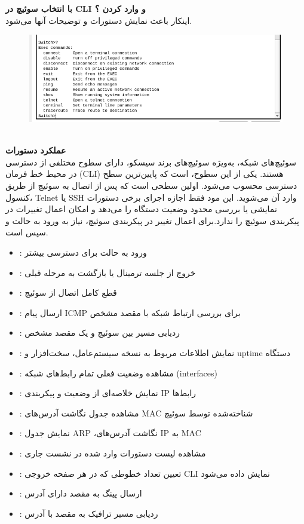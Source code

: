 
\textbf{با انتخاب سوئیچ در CLI و وارد کردن ؟}
\\
اینکار باعث نمایش دستورات و توضیحات آنها می‌شود.
\begin{figure}[h]
    \centering
    \includegraphics[width=1\textwidth]{img/q/1.png}
\end{figure}

\\
\textbf{عملکرد دستورات}
\\
سوئیچ‌های شبکه، به‌ویژه سوئیچ‌های برند سیسکو، دارای سطوح مختلفی از دسترسی در محیط خط فرمان (CLI) هستند. یکی از این سطوح،  است که پایین‌ترین سطح دسترسی محسوب می‌شود.
 اولین سطحی است که پس از اتصال به سوئیچ از طریق کنسول، Telnet یا SSH وارد آن می‌شوید. این مود فقط اجازه اجرای برخی دستورات نمایشی یا بررسی محدود وضعیت دستگاه را می‌دهد و امکان اعمال تغییرات در پیکربندی سوئیچ را ندارد.برای اعمال تغییر در پیکربندی سوئیچ، نیاز به ورود به حالت  و سپس  است.

\begin{itemize}
    \item {}: ورود به حالت  برای دسترسی بیشتر
    \item {}: خروج از جلسه ترمینال یا بازگشت به مرحله قبلی
    \item {}: قطع کامل اتصال از سوئیچ
    \item {}: ارسال پیام ICMP برای بررسی ارتباط شبکه با مقصد مشخص
    \item {}: ردیابی مسیر بین سوئیچ و یک مقصد مشخص
    \item {}: نمایش اطلاعات مربوط به نسخه سیستم‌عامل، سخت‌افزار و uptime دستگاه
    \item {}: مشاهده وضعیت فعلی تمام رابط‌های شبکه (interfaces)
    \item {}: نمایش خلاصه‌ای از وضعیت و پیکربندی IP رابط‌ها
    \item {}: مشاهده جدول نگاشت آدرس‌های MAC شناخته‌شده توسط سوئیچ
    \item {}: نمایش جدول ARP ،نگاشت آدرس‌های IP به MAC
    \item {}: مشاهده لیست دستورات وارد شده در نشست جاری
    \item {}: تعیین تعداد خطوطی که در هر صفحه خروجی CLI نمایش داده می‌شود
    \item {}: ارسال پینگ به مقصد دارای آدرس 
    \item {}: ردیابی مسیر ترافیک به مقصد با آدرس 
\end{itemize}


